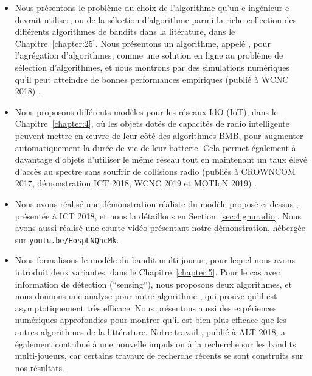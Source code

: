 \begin{resume_fr}
\begin{itemize}
    \item
    Nous présentons le problème du choix de l'algorithme qu'un-e ingénieur-e devrait utiliser, ou de la sélection d'algorithme parmi la riche collection des différents algorithmes de bandits dans la litérature, dans le Chapitre~\ref{chapter:25}.
    Nous présentons un algorithme, appelé \Aggr, pour l'agrégation d'algorithmes, comme une solution en ligne au problème de sélection d'algorithmes, et nous montrons par des simulations numériques qu'il peut atteindre de bonnes performances empiriques
    (publié à WCNC 2018) \cite{Besson2018WCNC}.

    \item
    Nous proposons différents modèles pour les réseaux IdO (IoT), dans le Chapitre~\ref{chapter:4}, où les objets dotés de capacités de radio intelligente peuvent mettre en œuvre de leur côté des algorithmes BMB, pour augmenter automatiquement la durée de vie de leur batterie.
    Cela permet également à davantage d'objets d'utiliser le même réseau tout en maintenant un taux élevé d'accès au spectre sans souffrir de collisions radio
    (publiés à CROWNCOM 2017, démonstration ICT 2018, WCNC 2019 et MOTIoN 2019)
    \cite{Bonnefoi17,Besson2018ICT,Besson2019WCNC,Bonnefoi2019WCNC}.

    \item
    Nous avons réalisé une démonstration réaliste du modèle proposé ci-dessus \cite{Besson2018ICT,Besson2019WCNC}, présentée à ICT 2018, et nous la détaillons en Section~\ref{sec:4:gnuradio}. Nous avons aussi réalisé une courte vidéo présentant notre démonstration, hébergée sur \texttt{\href{https://youtu.be/HospLNQhcMk}{youtu.be/HospLNQhcMk}}.


    \item
    Nous formalisons le modèle du bandit multi-joueur, pour lequel nous avons introduit deux variantes, dans le Chapitre~\ref{chapter:5}.
    Pour le cas avec information de détection (``sensing''), nous proposons deux algorithmes, et nous donnons une analyse pour notre algorithme \MCTopM, qui prouve qu'il est asymptotiquement très efficace.
    Nous présentons aussi des expériences numériques approfondies pour montrer qu'il est bien plus efficace que les autres algorithmes de la littérature.
    Notre travail \cite{Besson2018ALT}, publié à ALT 2018, a également contribué à une nouvelle impulsion à la recherche sur les bandits multi-joueurs, car certains travaux de recherche récents se sont construits sur nos résultats.


\end{itemize}
\end{resume_fr}
